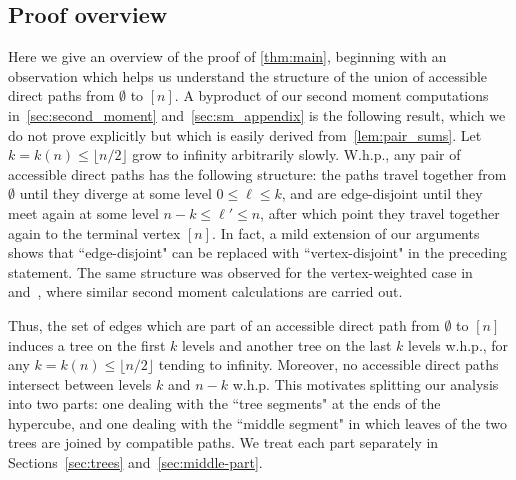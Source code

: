 \documentclass[11pt]{article}
\theoremstyle{definition}
\theoremstyle{remark}
\theoremstyle{remark}
\numberwithin{theorem}{section}
\begin{document}
\subsection{Proof overview}\label{sec:proof_overview}

Here we give an overview of the proof of \cref{thm:main}, beginning with an observation which helps us understand the structure of the union of accessible direct paths from $\emptyset$ to $[n]$. A byproduct of our second moment computations in~\cref{sec:second_moment} and~\cref{sec:sm_appendix} is the following result, which we do not prove explicitly but which is easily derived from~\cref{lem:pair_sums}. Let $k = k(n) \leq \lfloor n/2 \rfloor$ grow to infinity arbitrarily slowly. W.h.p., any pair of accessible direct paths has the following structure: the paths travel together from $\emptyset$ until they diverge at some level  $0 \leq \ell \leq k$, and are edge-disjoint until they meet again at some level $n-k \leq \ell' \leq n$, after which point they travel together again to the terminal vertex $[n]$. In fact, a mild extension of our arguments shows that ``edge-disjoint" can be replaced with ``vertex-disjoint" in the preceding statement. The same structure was observed for the vertex-weighted case in~\cite{berestycki2016number} and~\cite{hegarty2014existence}, where similar second moment calculations are carried out.

Thus, the set of edges which are part of an accessible direct path from $\emptyset$ to $[n]$ induces a tree on the first $k$ levels and another tree on the last $k$ levels w.h.p., for any $k = k(n) \leq \lfloor n/2 \rfloor$ tending to infinity. Moreover, no accessible direct paths intersect between levels $k$ and $n-k$ w.h.p. This motivates splitting our analysis into two parts: one dealing with the ``tree segments" at the ends of the hypercube, and one dealing with the ``middle segment" in which leaves of the two trees are joined by compatible paths. We treat each part separately in Sections~\ref{sec:trees} and~\ref{sec:middle-part}.
\end{document}
